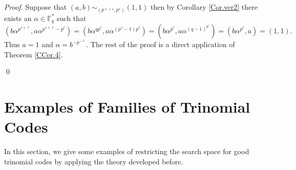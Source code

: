 \documentclass[12pt]{elsarticle}
\newcommand{\Fq}{\mathbb{F}_{q}}
\theoremstyle{break}
{\theorembodyfont{\upshape}
    \newtheorem{theorem}{Theorem}[section] %
    \newtheorem{lemma}[theorem]{Lemma} %
    \newtheorem{proposition}[theorem]{Proposition}
    \newtheorem{corollary}[theorem]{Corollary}
    \newtheorem{definition}[theorem]{Definition}
    \newtheorem{example}[theorem]{Example}
    \newtheorem{remark}[theorem]{Remark}
    \newtheorem{conjecture}[theorem]{Conjecture}
    \newtheorem*{proof}{{Proof}}
	\newtheorem*{notation}{Notation}
	\newtheorem*{main}{Cain Theorem}
	\newtheorem*{problem}{Problem}
}
\begin{document}
\begin{proof}
 Suppose that $(a,b) \sim_{(p^{\ell+s},p^{\ell})}(1,1)$ then  by Corollary \ref{Cor.ver2} there exists an $\alpha\in \Fq^*$ such that  
 $$ (b \alpha^{p^{s+\ell}}, a \alpha^{p^{s+\ell}-p^{\ell}})= (b \alpha^{ q p^{\ell}}, a \alpha^{(p^s-1)p^{\ell}}) =(b\alpha^{p^{\ell}}, a\alpha^{(q-1)^{p^{\ell}}})=(b\alpha^{p^{\ell}},a )=(1,1).$$
 Thus $a=1$ and $ \alpha= b^{-p^{-\ell}}$. The rest of the proof is a direct application of Theorem \ref{CCor.4}.
 
\qed

\end{proof}




    







\section{Examples of Families of Trinomial Codes}\label{sec:examples}

\noindent In this section, we give some examples of restricting the search space for good trinomial codes by applying the theory developed before. 
\end{document}
